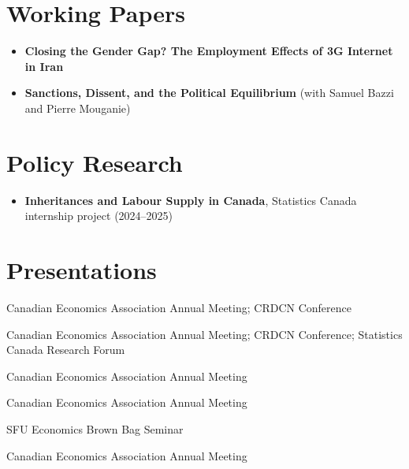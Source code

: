 \documentclass[11pt,letterpaper]{article}
\newcommand{\paper}[1]{\textbf{#1}}
\begin{document}
\section{Working Papers}
\begin{itemize}
  \item \paper{Closing the Gender Gap? The Employment Effects of 3G Internet in Iran}
  \item \paper{Sanctions, Dissent, and the Political Equilibrium} (with Samuel Bazzi and Pierre Mouganie)
\end{itemize}

\section{Policy Research}
\begin{itemize}
  \item \paper{Inheritances and Labour Supply in Canada}, Statistics Canada internship project (2024--2025)
\end{itemize}

\section{Presentations}
\begin{description}[leftmargin=3.5em,labelwidth=3em,labelsep=0.5em,font=\normalfont,itemsep=0pt]
  \item[2026] Canadian Economics Association Annual Meeting; CRDCN Conference
  \item[2025] Canadian Economics Association Annual Meeting; CRDCN Conference; Statistics Canada Research Forum
  \item[2024] Canadian Economics Association Annual Meeting
  \item[2023] Canadian Economics Association Annual Meeting
  \item[2022] SFU Economics Brown Bag Seminar
  \item[2021] Canadian Economics Association Annual Meeting
\end{description}
\end{document}
